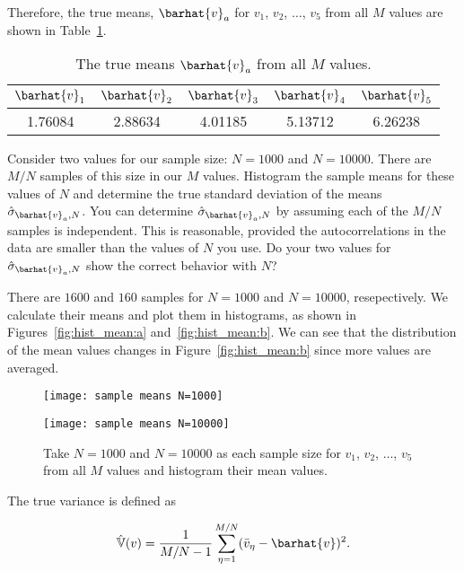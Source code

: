 Therefore, the true means, $\barhat{v}_a$ for $v_1$, $v_2$, $\ldots$, $v_5$ from
all $M$ values are shown in Table~\ref{tab:truemean}.

\begin{table}[H]
    \centering
    \caption{The true means $\barhat{v}_a$ from all $M$ values.}
    \label{tab:truemean}
    \begin{tabular}{@{}ccccc@{}}
        \toprule
        $\barhat{v}_1$ & $\barhat{v}_2$ & $\barhat{v}_3$ & $\barhat{v}_4$ & $\barhat{v}_5$ \\
        \midrule
        1.76084        & 2.88634        & 4.01185        & 5.13712        & 6.26238        \\
        \bottomrule
    \end{tabular}
\end{table}

\Question{} Consider two values for our sample size: $N = 1000$ and $N = 10000$. There are
$M/N$ samples of this size in our $M$ values. Histogram the sample means for these values of
$N$ and determine the true standard deviation of the means $\hat{\sigma}_{\barhat{v}_a,N}$.
You can determine $\hat{\sigma}_{\barhat{v}_a,N}$ by assuming each of the $M/N$ samples is
independent. This is reasonable, provided the autocorrelations in the data are smaller than
the values of $N$ you use. Do your two values for $\hat{\sigma}_{\barhat{v}_a,N}$ show the
correct behavior with $N$?

\Answer{}

There are $1600$ and $160$ samples for $N = 1000$ and $N = 10000$, resepectively.
We calculate their means and plot them in histograms, as shown in
Figures~\ref{fig:hist_mean:a} and~\ref{fig:hist_mean:b}.
We can see that the distribution of the mean values changes in Figure~\ref{fig:hist_mean:b}
since more values are averaged.

\begin{figure}[h]
    \centering
    \begin{minipage}[t]{0.8\linewidth}
        \centering
        \texttt{[image: sample means N=1000]}
        \label{fig:hist_mean:a}
    \end{minipage}
    \hfill
    \begin{minipage}[t]{0.8\linewidth}
        \centering
        \texttt{[image: sample means N=10000]}
        \label{fig:hist_mean:b}
    \end{minipage}
    \label{fig:hist_mean}
    \caption{Take $N = 1000$ and $N = 10000$ as each sample size
        for $v_1$, $v_2$, $\ldots$, $v_5$ from all $M$ values
        and histogram their mean values.}
\end{figure}

The true variance is defined as

\begin{equation}
    \hat{\mathbb{V}}(v) = \frac{ 1 }{ M/N - 1 }
    \sum_{\eta=1}^{M/N} (\bar{v}_\eta - \barhat{v})^2.
\end{equation}
